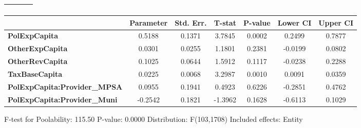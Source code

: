 \begin{center}
\begin{tabular}{lclc}
\textbf{}                            &                    & \textbf{                     }   &                  \\
\bottomrule
\end{tabular}
\begin{tabular}{lcccccc}
                                     & \textbf{Parameter} & \textbf{Std. Err.} & \textbf{T-stat} & \textbf{P-value} & \textbf{Lower CI} & \textbf{Upper CI}  \\
\midrule
\textbf{PolExpCapita}                &       0.5188       &       0.1371       &      3.7845     &      0.0002      &       0.2499      &       0.7877       \\
\textbf{OtherExpCapita}              &       0.0301       &       0.0255       &      1.1801     &      0.2381      &      -0.0199      &       0.0802       \\
\textbf{OtherRevCapita}              &       0.1025       &       0.0644       &      1.5912     &      0.1117      &      -0.0238      &       0.2288       \\
\textbf{TaxBaseCapita}               &       0.0225       &       0.0068       &      3.2987     &      0.0010      &       0.0091      &       0.0359       \\
\textbf{PolExpCapita:Provider\_MPSA} &       0.0955       &       0.1941       &      0.4923     &      0.6226      &      -0.2851      &       0.4762       \\
\textbf{PolExpCapita:Provider\_Muni} &      -0.2542       &       0.1821       &     -1.3962     &      0.1628      &      -0.6113      &       0.1029       \\
\bottomrule
\end{tabular}
\end{center}

F-test for Poolability: 115.50 \newline
 P-value: 0.0000 \newline
 Distribution: F(103,1708) \newline
  \newline
 Included effects: Entity